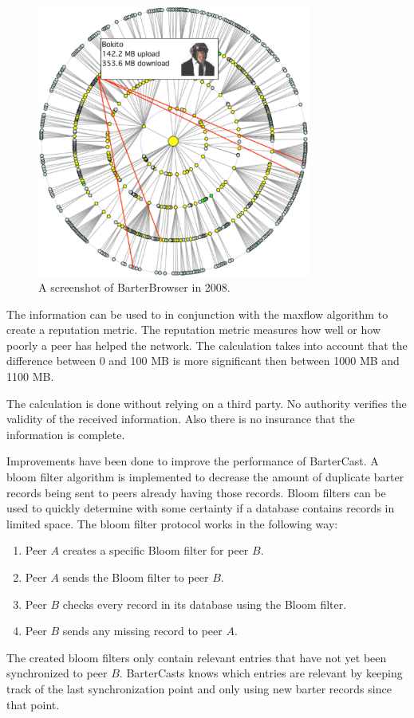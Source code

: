 \begin{figure}
	\centerline{\includegraphics[width=0.8\textwidth]{relatedWork/figs/barterBrowser.eps}}
	\caption{A screenshot of BarterBrowser in 2008\cite{pouwelse-buddycast}.}
	\label{fig:barterbrowser}
\end{figure}

The information can be used to in conjunction with the maxflow algorithm
to create a reputation metric\cite{meulpolder-bartercast-paper}.
The reputation metric measures how well or how poorly a peer has helped the network.
The calculation takes into account that the difference between 0 and 100 MB is more significant
then between 1000 MB and 1100 MB.

The calculation is done without relying on a third party.
No authority verifies the validity of the received information.
Also there is no insurance that the information is complete.

Improvements have been done to improve the performance of BarterCast.
A bloom filter algorithm is implemented to decrease the amount of duplicate barter records
being sent to peers already having those records\cite{logiotatidis-splash}.
Bloom filters can be used to quickly determine with some certainty
if a database contains records in limited space\cite{broder-bloomfilter}.
The bloom filter protocol works in the following way:
\begin{enumerate}
    \item Peer $A$ creates a specific Bloom filter for peer $B$.
    \item Peer $A$ sends the Bloom filter to peer $B$.
    \item Peer $B$ checks every record in its database using the Bloom filter.
    \item Peer $B$ sends any missing record to peer $A$.
\end{enumerate}
The created bloom filters only contain relevant entries that have not yet been synchronized to peer $B$.
BarterCasts knows which entries are relevant by keeping track of the last synchronization point
and only using new barter records since that point.

